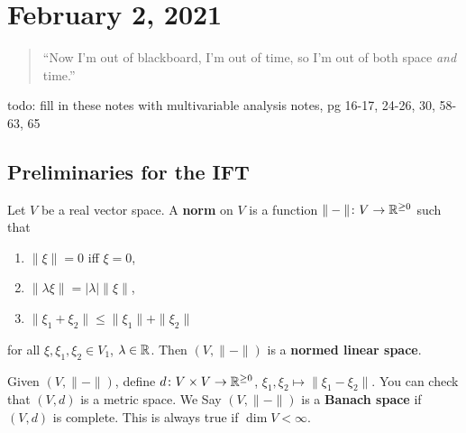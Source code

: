 \section{February 2, 2021}
\begin{quotation}
    ``Now I'm out of blackboard, I'm out of time, so I'm out of both space \emph{and} time.''
\end{quotation}
{\color{red} todo: fill in these notes with multivariable analysis notes, pg 16-17, 24-26, 30, 58-63, 65}
\subsection{Preliminaries for the IFT}
\begin{definition}[]
    Let $V$ be a real vector space. A \textbf{norm} on $V$ is a function $\|-\|\colon V \to \mathbb{R}^{\geq 0}$ such that 
    \begin{enumerate}[label=(\roman*)]
        \item $\|\xi\|=0$ iff $\xi=0$,
        \item $\|\lambda \xi\|=|\lambda| \|\xi\|$,
        \item $\|\xi_1+\xi_2\|\leq \|\xi_1\|+\|\xi_2\|$
    \end{enumerate}
    for all $\xi,\xi_1,\xi_2\in V_1$, $\lambda \in \mathbb{R}$. Then $(V, \|-\|)$ is a \textbf{normed linear space}.
\end{definition}
Given $(V,\|-\|)$, define $d \colon V\times V \to \mathbb{R}^{\geq 0}$, $\xi_1,\xi_2 \mapsto \|\xi_1-\xi_2\|$. You can check that $(V,d)$ is a metric space. We Say $(V, \|-\|)$ is a \textbf{Banach space} if $(V,d)$ is complete. This is always true if $\operatorname{dim}V<\infty$.

